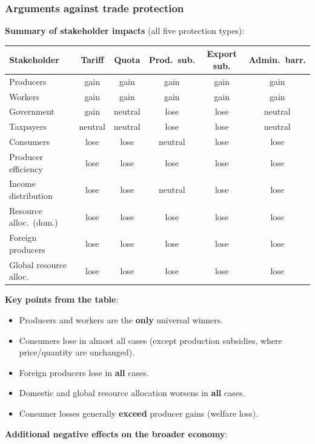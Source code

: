 \subsubsection*{Arguments against trade protection}
\textbf{Summary of stakeholder impacts} (all five protection types):
\begin{center}
\renewcommand{\arraystretch}{1.3}
\footnotesize
\begin{tabular}{lccccc}
\toprule
\textbf{Stakeholder} & \textbf{Tariff} & \textbf{Quota} & \textbf{Prod.\ sub.} & \textbf{Export sub.} & \textbf{Admin.\ barr.} \\
\midrule
Producers & gain & gain & gain & gain & gain \\
Workers & gain & gain & gain & gain & gain \\
Government & gain & neutral & lose & lose & neutral \\
Taxpayers & neutral & neutral & lose & lose & neutral \\
Consumers & lose & lose & neutral & lose & lose \\
Producer efficiency & lose & lose & lose & lose & lose \\
Income distribution & lose & lose & neutral & lose & lose \\
Resource alloc.\ (dom.) & lose & lose & lose & lose & lose \\
Foreign producers & lose & lose & lose & lose & lose \\
Global resource alloc. & lose & lose & lose & lose & lose \\
\bottomrule
\end{tabular}
\end{center}
\textbf{Key points from the table}:
\begin{itemize}
  \item Producers and workers are the \textbf{only} universal winners.
  \item Consumers lose in almost all cases (except production subsidies, where price/quantity are unchanged).
  \item Foreign producers lose in \textbf{all} cases.
  \item Domestic and global resource allocation worsens in \textbf{all} cases.
  \item Consumer losses generally \textbf{exceed} producer gains (welfare loss).
\end{itemize}
\textbf{Additional negative effects on the broader economy}:
